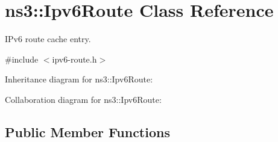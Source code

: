 \hypertarget{classns3_1_1Ipv6Route}{}\section{ns3\+:\+:Ipv6\+Route Class Reference}
\label{classns3_1_1Ipv6Route}


I\+Pv6 route cache entry.  




{\ttfamily \#include $<$ipv6-\/route.\+h$>$}



Inheritance diagram for ns3\+:\+:Ipv6\+Route\+:


Collaboration diagram for ns3\+:\+:Ipv6\+Route\+:
\subsection*{Public Member Functions}
